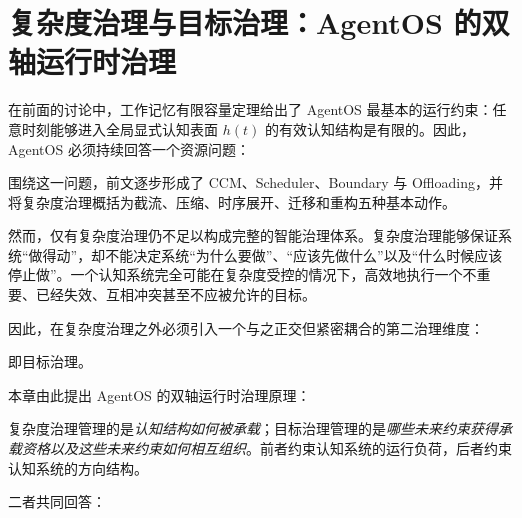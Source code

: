 \chapter{复杂度治理与目标治理：AgentOS 的双轴运行时治理}
\label{chap:complexity-goal-governance}

在前面的讨论中，工作记忆有限容量定理给出了 AgentOS 最基本的运行约束：任意时刻能够进入全局显式认知表面 $h(t)$ 的有效认知结构是有限的。因此，AgentOS 必须持续回答一个资源问题：

\begin{chapterlead}
\centering
{}
\end{chapterlead}

围绕这一问题，前文逐步形成了 CCM、Scheduler、Boundary 与 Offloading，并将复杂度治理概括为截流、压缩、时序展开、迁移和重构五种基本动作。

然而，仅有复杂度治理仍不足以构成完整的智能治理体系。复杂度治理能够保证系统``做得动''，却不能决定系统``为什么要做''、``应该先做什么''以及``什么时候应该停止做''。一个认知系统完全可能在复杂度受控的情况下，高效地执行一个不重要、已经失效、互相冲突甚至不应被允许的目标。

因此，在复杂度治理之外必须引入一个与之正交但紧密耦合的第二治理维度：

\begin{statementbox}
\centering
{}
\end{statementbox}

即目标治理。

本章由此提出 AgentOS 的双轴运行时治理原理：

\begin{statementbox}
\centering
{}
\end{statementbox}

复杂度治理管理的是\emph{认知结构如何被承载}；目标治理管理的是\emph{哪些未来约束获得承载资格以及这些未来约束如何相互组织}。前者约束认知系统的运行负荷，后者约束认知系统的方向结构。

二者共同回答：

\begin{statementbox}
\centering
{}
\end{statementbox}

